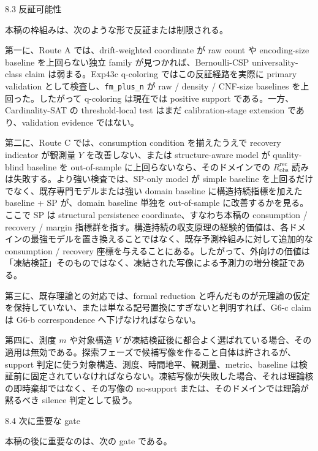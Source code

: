 \documentclass[12pt,a4paper]{article}
\begin{document}
8.3 反証可能性

本稿の枠組みは、次のような形で反証または制限される。

第一に、Route A では、drift-weighted coordinate が raw count や encoding-size baseline を上回らない独立 family が見つかれば、Bernoulli-CSP universality-class claim は弱まる。Exp43c q-coloring ではこの反証経路を実際に primary validation として検査し、\texttt{fm\_plus\_n} が raw / density / CNF-size baselines を上回った。したがって q-coloring は現在では positive support である。一方、Cardinality-SAT の threshold-local test はまだ calibration-stage extension であり、validation evidence ではない。

第二に、Route C では、consumption condition を揃えたうえで recovery indicator が観測量 \(Y\) を改善しない、または structure-aware model が quality-blind baseline を out-of-sample に上回らないなら、そのドメインでの \(R_{\mathrm{obs}}^{\mathrm{rec}}\) 読みは失敗する。より強い検査では、SP-only model が simple baseline を上回るだけでなく、既存専門モデルまたは強い domain baseline に構造持続指標を加えた baseline + SP が、domain baseline 単独を out-of-sample に改善するかを見る。ここで SP は structural persistence coordinate、すなわち本稿の consumption / recovery / margin 指標群を指す。構造持続の収支原理の経験的価値は、各ドメインの最強モデルを置き換えることではなく、既存予測枠組みに対して追加的な consumption / recovery 座標を与えることにある。したがって、外向けの価値は「凍結検証」そのものではなく、凍結された写像による予測力の増分検証である。

第三に、既存理論との対応では、formal reduction と呼んだものが元理論の仮定を保持していない、または単なる記号置換にすぎないと判明すれば、G6-c claim は G6-b correspondence へ下げなければならない。

第四に、測度 \(m\) や対象構造 \(V\) が凍結検証後に都合よく選ばれている場合、その適用は無効である。探索フェーズで候補写像を作ること自体は許されるが、support 判定に使う対象構造、測度、時間地平、観測量、metric、baseline は検証前に固定されていなければならない。凍結写像が失敗した場合、それは理論核の即時棄却ではなく、その写像の no-support または、そのドメインでは理論が黙るべき silence 判定として扱う。

8.4 次に重要な gate

本稿の後に重要なのは、次の gate である。
\end{document}
